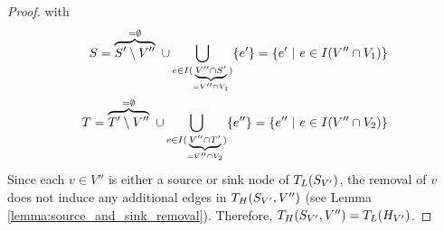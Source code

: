 \begin{proof}
with
\begin{align*}
S = \overbrace{S' \setminus V''}^{= \emptyset}\ \cup \bigcup\limits_{e \in I(\underbrace{\scriptstyle V'' \cap S'}_{= V'' \cap V_1})} \{e'\} = \{e'\ |\ e \in I(V'' \cap V_1)\} \\
T = \overbrace{T' \setminus V''}^{= \emptyset}\ \cup \bigcup\limits_{e \in I(\underbrace{\scriptstyle V'' \cap T'}_{= V'' \cap V_2})} \{e''\} = \{e''\ |\ e \in I(V'' \cap V_2)\}
\end{align*}
Since each $v \in V''$ is either a source or sink node of $T_L(S_{V'})$, the 
removal of $v$ does not induce any additional edges in $T_H(S_{V'},V'')$
(see Lemma \ref{lemma:source_and_sink_removal}). Therefore,
$T_H(S_{V'},V'') = T_L(H_{V'})$.
\end{proof}

